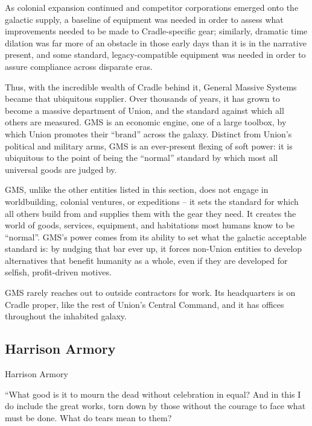 As colonial expansion continued and competitor corporations emerged onto the galactic supply, a  
baseline of equipment was needed in order to assess what improvements needed to be made to  
Cradle-specific gear; similarly, dramatic time dilation was far more of an obstacle in those early  
days than it is in the narrative present, and some standard, legacy-compatible equipment was  
needed in order to assure compliance across disparate eras.   

                                                                                                                


Thus, with the incredible wealth of Cradle behind it, General Massive Systems became that  
ubiquitous supplier. Over thousands of years, it has grown to become a massive department of  
Union, and the standard against which all others are measured. GMS is an economic engine, one  
of a large toolbox, by which Union promotes their “brand” across the galaxy. Distinct from Union’s  
political and military arms, GMS is an ever-present flexing of soft power: it is ubiquitous to the  
point of being the “normal” standard by which most all universal goods are judged by.   

GMS, unlike the other entities listed in this section, does not engage in worldbuilding, colonial  
ventures, or expeditions -- it sets the standard for which all others build from and supplies them  
with the gear they need. It creates the world of goods, services, equipment, and habitations most  
humans know to be “normal”. GMS’s power comes from its ability to set what the galactic  
acceptable standard is: by nudging that bar ever up, it forces non-Union entities to develop  
alternatives that benefit humanity as a whole, even if they are developed for selfish, profit-driven  
motives.   

GMS rarely reaches out to outside contractors for work. Its headquarters is on Cradle proper, like  
the rest of Union’s Central Command, and it has offices throughout the inhabited galaxy.  
\subsection{Harrison Armory}
Harrison Armory  

         “What good is it to mourn the dead without celebration in equal? And in this I do include the  
         great works, torn down by those without the courage to face what must be done. What do  
         tears mean to them?  


